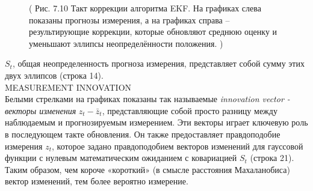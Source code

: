 \documentclass[10pt,a4paper]{article}
\begin{document}
\begin{figure}[H]
	\caption{ (  Рис. 7.10 Такт коррекции алгоритма EKF. На графиках слева показаны прогнозы измерения, а на графиках справа – результирующие коррекции, которые обновляют среднюю оценку и уменьшают эллипсы неопределённости положения. )}
	\label{fig:710orig}
\end{figure}


$S_t$, общая неопределенность прогноза измерения, представляет собой сумму этих двух эллипсов (строка 14).\\
MEASUREMENT INNOVATION\\ Белыми стрелками
на графиках показаны так называемые \textit{innovation vector - векторы изменения} $z_t-\bar{z}_t$, представляющие собой просто разницу между наблюдаемым и прогнозируемым измерением. Эти векторы играет ключевую роль в последующем такте обновления. Он также предоставляет правдоподобие измерения $z_t$, которое задано правдоподобием векторов изменений для гауссовой функции с нулевым математическим ожиданием с ковариацией $S_t$ (строка 21). Таким образом, чем короче «короткий»  (в смысле расстояния Махаланобиса) вектор изменений, тем более вероятно измерение.\\
\end{document}
